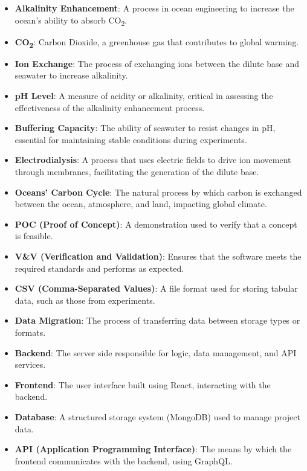 \documentclass[12pt]{article}
\begin{document}
\begin{itemize}
    \item \textbf{Alkalinity Enhancement}: A process in ocean engineering to
    increase the ocean's ability to absorb CO\textsubscript{2}.
    \item \textbf{CO\textsubscript{2}}: Carbon Dioxide, a greenhouse gas that
    contributes to global warming.
    \item \textbf{Ion Exchange}: The process of exchanging ions between the
    dilute base and seawater to increase alkalinity.
    \item \textbf{pH Level}: A measure of acidity or alkalinity, critical in
    assessing the effectiveness of the alkalinity enhancement process.
    \item \textbf{Buffering Capacity}: The ability of seawater to resist changes
    in pH, essential for maintaining stable conditions during experiments.
    \item \textbf{Electrodialysis}: A process that uses electric fields to drive
    ion movement through membranes, facilitating the generation of the dilute
    base.
    \item \textbf{Oceans' Carbon Cycle}: The natural process by which carbon is
    exchanged between the ocean, atmosphere, and land, impacting global climate.
    \item \textbf{POC (Proof of Concept)}: A demonstration used to verify that a
    concept is feasible.
    \item \textbf{V\&V (Verification and Validation)}: Ensures that the software
    meets the required standards and performs as expected.
    \item \textbf{CSV (Comma-Separated Values)}: A file format used for storing
    tabular data, such as those from experiments.
    \item \textbf{Data Migration}: The process of transferring data between
    storage types or formats.
    \item \textbf{Backend}: The server side responsible for logic, data
    management, and API services.
    \item \textbf{Frontend}: The user interface built using React, interacting
    with the backend.
    \item \textbf{Database}: A structured storage system (MongoDB) used to
    manage project data.
    \item \textbf{API (Application Programming Interface)}: The means by which
    the frontend communicates with the backend, using GraphQL.

\end{itemize}
\end{document}
